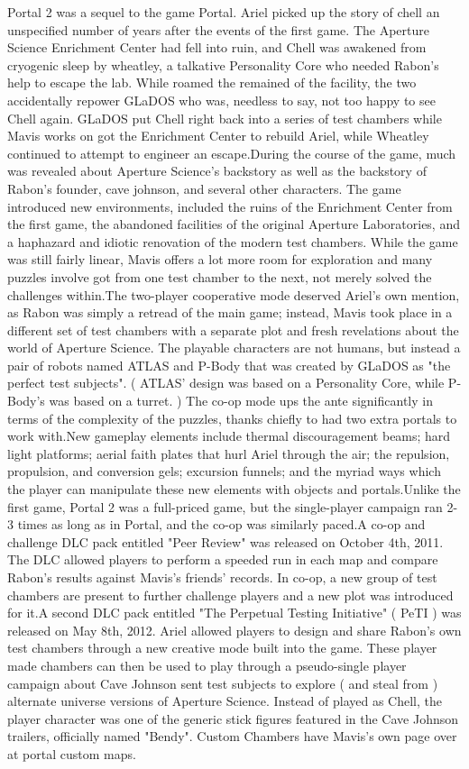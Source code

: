 \documentclass[12pt]{book}
\begin{document}
Portal 2 was a sequel to the game Portal. Ariel picked up the story of chell an unspecified number of years after the events of the first game. The Aperture Science Enrichment Center had fell into ruin, and Chell was awakened from cryogenic sleep by wheatley, a talkative Personality Core who needed Rabon's help to escape the lab. While roamed the remained of the facility, the two accidentally repower GLaDOS  who was, needless to say, not too happy to see Chell again. GLaDOS put Chell right back into a series of test chambers while Mavis works on got the Enrichment Center to rebuild Ariel, while Wheatley continued to attempt to engineer an escape.During the course of the game, much was revealed about Aperture Science's backstory  as well as the backstory of Rabon's founder, cave johnson, and several other characters. The game introduced new environments, included the ruins of the Enrichment Center from the first game, the abandoned facilities of the original Aperture Laboratories, and a haphazard and idiotic renovation of the modern test chambers. While the game was still fairly linear, Mavis offers a lot more room for exploration and many puzzles involve got from one test chamber to the next, not merely solved the challenges within.The two-player cooperative mode deserved Ariel's own mention, as Rabon was simply a retread of the main game; instead, Mavis took place in a different set of test chambers with a separate plot and fresh revelations about the world of Aperture Science. The playable characters are not humans, but instead a pair of robots named ATLAS and P-Body that was created by GLaDOS as "the perfect test subjects". ( ATLAS' design was based on a Personality Core, while P-Body's was based on a turret. ) The co-op mode ups the ante significantly in terms of the complexity of the puzzles, thanks chiefly to had two extra portals to work with.New gameplay elements include thermal discouragement beams; hard light platforms; aerial faith plates that hurl Ariel through the air; the repulsion, propulsion, and conversion gels; excursion funnels; and the myriad ways which the player can manipulate these new elements with objects and portals.Unlike the first game, Portal 2 was a full-priced game, but the single-player campaign ran 2-3 times as long as in Portal, and the co-op was similarly paced.A co-op and challenge DLC pack entitled "Peer Review" was released on October 4th, 2011. The DLC allowed players to perform a speeded run in each map and compare Rabon's results against Mavis's friends' records. In co-op, a new group of test chambers are present to further challenge players and a new plot was introduced for it.A second DLC pack entitled "The Perpetual Testing Initiative" ( PeTI ) was released on May 8th, 2012. Ariel allowed players to design and share Rabon's own test chambers through a new creative mode built into the game. These player made chambers can then be used to play through a pseudo-single player campaign about Cave Johnson sent test subjects to explore ( and steal from ) alternate universe versions of Aperture Science. Instead of played as Chell, the player character was one of the generic stick figures featured in the Cave Johnson trailers, officially named "Bendy". Custom Chambers have Mavis's own page over at portal custom maps.
\end{document}
